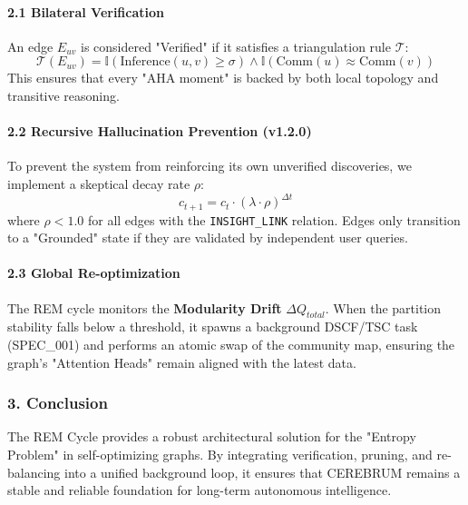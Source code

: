 \paragraph{2.1 Bilateral Verifi\-cation}
An edge $E_{uv}$ is considered "Verified" if it satisfies a trian\-gulation rule $\mathcal{T}$:
\begin{equation}
\mathcal{T}(E_{uv}) = \mathbb{I}(\text{Inference}(u,v) \geq \sigma) \land \mathbb{I}(\text{Comm}(u) \approx \text{Comm}(v))
\end{equation}
This ensures that every "AHA moment" is backed by both local topology and transitive reasoning.

\paragraph{2.2 Recursive Halluc\-ination Prevention (v1.2.0)}
To prevent the system from reinforcing its own unverified discoveries, we implement a skeptical decay rate $\rho$:
\begin{equation}
c_{t+1} = c_t \cdot (\lambda \cdot \rho)^{\Delta t}
\end{equation}
where $\rho < 1.0$ for all edges with the \texttt{INSIGHT\_LINK} relation. Edges only transition to a "Grounded" state if they are validated by independent user queries.

\paragraph{2.3 Global Re-optim\-ization}
The REM cycle monitors the \textbf{Modularity Drift} $\Delta Q_{total}$. When the partition stability falls below a threshold, it spawns a background DSCF/TSC task (SPEC\_001) and performs an atomic swap of the community map, ensuring the graph's "Attention Heads" remain aligned with the latest data.

\subsubsection{3. Conclusion}
The REM Cycle provides a robust archi\-tectural solution for the "Entropy Problem" in self-optimizing graphs. By integrating verif\-ication, pruning, and re-balancing into a unified background loop, it ensures that CEREBRUM remains a stable and reliable foundation for long-term autonomous intel\-ligence.

